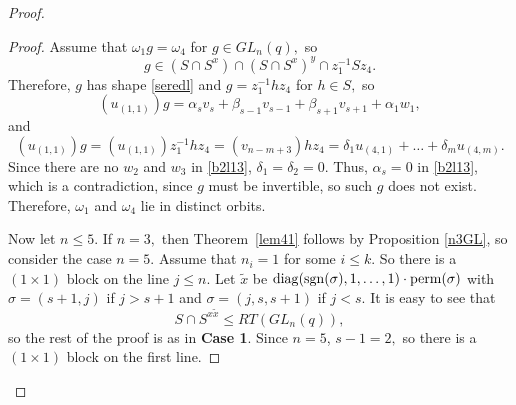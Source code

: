 \begin{proof}
\begin{proof}
Assume that $\omega_1 g =\omega_4$ for $g \in GL_n(q),$ so 
$$g \in (S \cap S^x) \cap (S \cap S^x)^y \cap z_1^{-1}Sz_4.$$
Therefore, $g$ has shape \eqref{seredl} and $g=z_1^{-1}hz_4$ for $h \in S,$ so 
\begin{equation}\label{b2l13}
(u_{(1,1)})g=\alpha_{s}v_{s}+\beta_{s-1}v_{s-1}+\beta_{s+1}v_{s+1}  +\alpha_1 w_1,
\end{equation}
and 
\begin{equation}\label{b2l14}
(u_{(1,1)})g=(u_{(1,1)})z_1^{-1}hz_4=(v_{n-m+3})hz_4 = \delta_1 u_{(4,1)} + \ldots + \delta_m u_{(4,m)}.
\end{equation}
Since there are no $w_2$ and $w_3$ in \eqref{b2l13}, $\delta_1=\delta_2=0$. Thus, $\alpha_s=0$ in \eqref{b2l13}, which is a contradiction, since $g$ must be invertible, so such $g$ does not exist. Therefore, $\omega_1$ and $\omega_4$ lie in  distinct orbits. 

Now let $n \le 5.$ If $n=3,$ then Theorem~\ref{lem41} follows by Proposition \ref{n3GL}, so consider the case $n=5.$
Assume that $n_i=1$ for some $i\le k$. So there is a $(1\times 1)$ block on the line $j \le n$. Let $\tilde{x}$ be $\mathrm{diag}(\mathrm{sgn}(\sigma),1, \ldots, 1) \cdot \mathrm{perm}(\sigma)$ with $\sigma=(s+1,j)$ if $j>s+1$ and  $\sigma=(j,s,s+1)$ if $j<s.$ It is easy to see that 
$$S \cap S^{x \tilde x}\le RT(GL_n(q)),$$
so the rest of the proof is  as in {\bf Case 1}. Since $n=5$,  $s-1=2,$ so there is a $(1 \times 1)$ block on the first line. 
\end{proof}


\end{proof}
